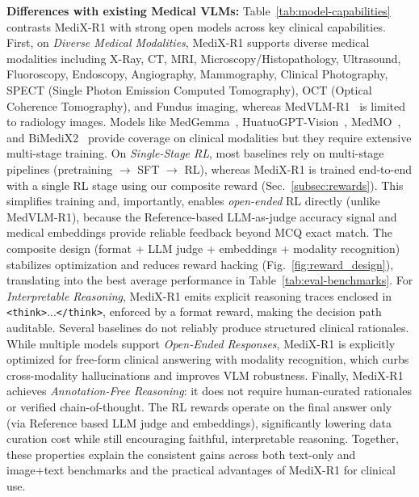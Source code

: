\documentclass{article}
\theoremstyle{plain}
\theoremstyle{definition}
\theoremstyle{remark}
\begin{document}
\textbf{Differences with existing Medical VLMs:}
Table~\ref{tab:model-capabilities} contrasts MediX-R1 with strong open models across key clinical capabilities. First, on \emph{Diverse Medical Modalities}, MediX-R1 supports diverse medical modalities including X-Ray, CT, MRI, Microscopy/Histopathology, Ultrasound, Fluoroscopy, Endoscopy, Angiography, Mammography, Clinical Photography, SPECT (Single Photon Emission Computed Tomography), OCT (Optical Coherence Tomography), and Fundus imaging, whereas MedVLM-R1~\citep{pan2025medvlm} is limited to radiology images. Models like MedGemma~\citep{sellergren2025medgemma}, HuatuoGPT-Vision~\citep{chen2024huatuogptvisioninjectingmedicalvisual}, MedMO~\citep{deria2026medmogroundingunderstandingmultimodal}, and BiMediX2~\citep{mullappilly2024bimedix2biomedicalexpertlmm} provide coverage on clinical modalities but they require extensive multi-stage training. On \emph{Single-Stage RL}, most baselines rely on multi-stage pipelines (pretraining $\rightarrow$ SFT $\rightarrow$ RL), whereas MediX-R1 is trained end-to-end with a single RL stage using our composite reward (Sec.~\ref{subsec:rewards}). This simplifies training and, importantly, enables \emph{open-ended} RL directly (unlike MedVLM-R1), because the Reference-based LLM-as-judge accuracy signal and medical embeddings provide reliable feedback beyond MCQ exact match. The composite design (format + LLM judge + embeddings + modality recognition) stabilizes optimization and reduces reward hacking (Fig.~\ref{fig:reward_design}), translating into the best average performance in Table~\ref{tab:eval-benchmarks}. For \emph{Interpretable Reasoning}, MediX-R1 emits explicit reasoning traces enclosed in {\small\texttt{<think>}...\texttt{</think>}}, enforced by a format reward, making the decision path auditable. Several baselines do not reliably produce structured clinical rationales. While multiple models support \emph{Open-Ended Responses}, MediX-R1 is explicitly optimized for free-form clinical answering with modality recognition, which curbs cross-modality hallucinations and improves VLM robustness. Finally, MediX-R1 achieves \emph{Annotation-Free Reasoning}: it does not require human-curated rationales or verified chain-of-thought. The RL rewards operate on the final answer only (via Reference based LLM judge and embeddings), significantly lowering data curation cost while still encouraging faithful, interpretable reasoning. Together, these properties explain the consistent gains across both text-only and image+text benchmarks and the practical advantages of MediX-R1 for clinical use.
\end{document}
